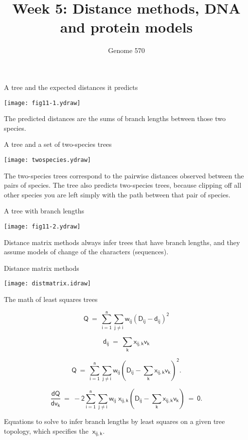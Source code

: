 \documentclass[bluish,slideColor,colorBG,pdf]{prosper}
\title{Week 5:  Distance methods, DNA and protein models}
\author{Genome 570}
\begin{document}
\maketitle

\bigskip

\begin{slide}[Replace]{A tree and the expected distances it predicts}

\centerline{\texttt{[image: fig11-1.ydraw]}}
\bigskip

The predicted distances are the sums of branch lengths between those two
species.

\end{slide}

\begin{slide}[Replace]{A tree and a set of two-species trees}
\bigskip

\centerline{\texttt{[image: twospecies.ydraw]}}
\bigskip

The two-species trees correspond to the pairwise distances
observed between the pairs of species.  The tree also predicts
two-species trees, because clipping off all other species you are
left simply with the path between that pair of species.

\end{slide}

\begin{slide}[Replace]{A tree with branch lengths}
\bigskip

\centerline{\texttt{[image: fig11-2.ydraw]}}
\bigskip

Distance matrix methods always infer trees that have branch lengths, and they
assume models of change of the characters (sequences).

\end{slide}

\begin{slide}[Replace]{Distance matrix methods}

\vspace{-0.1in}
\hspace*{0in}\hspace{-0.3in}\centerline{\texttt{[image: distmatrix.idraw]}}

\end{slide}

\begin{slide}[Replace]{The math of least squares trees}

\[
\mathsf{Q \ =\  \sum_{i=1}^n \sum_{j \neq i}  w_{ij} (D_{ij}-d_{ij})^2}
\]

\[
\mathsf{d_{ij}\  =\  \sum\limits_k x_{ij,k} v_k}
\]

\[
\mathsf{Q\  =\  \sum_{i=1}^n \sum_{j \neq i}  w_{ij} \left(D_{ij}-\sum\limits_k x_{ij,k} v_k\right)^2.  }
\]

\[
\mathsf{\frac{dQ}{dv_k}\  =\  -2 \sum_{i=1}^n \sum_{j \neq i}  w_{ij}\; x_{ij,k} \left(D_{ij}-\sum\limits_k x_{ij,k} v_k\right)\  =\  0.}
\]

Equations to solve to infer branch lengths by least squares on a given tree
topology, which specifies the $\ \mathsf{x_{ij,k}}$.

\end{slide}
\end{document}

